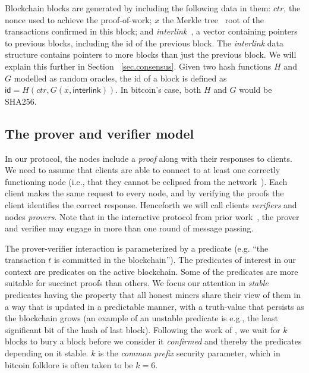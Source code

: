 Blockchain blocks are generated by including the following data in them: $ctr$,
the nonce used to achieve the proof-of-work; $x$ the Merkle tree~\cite{merkle}
root of the transactions confirmed in this block; and
\textit{interlink}~\cite{KLS}, a vector containing pointers to previous blocks,
including the id of the previous block. The \textit{interlink} data structure
contains pointers to more blocks than just the previous block. We will explain
this further in Section~ \ref{sec.consensus}. Given two hash functions $H$ and
$G$ modelled as random oracles, the id of a block is defined as $\textsf{id} =
H(ctr, G(x, \textsf{interlink}))$. In bitcoin's case, both $H$ and $G$ would be
SHA256.

\subsection{The prover and verifier model}
In our protocol, the nodes include a \emph{proof} along with their responses to
clients. We need to assume that clients are able to connect to at least one
correctly functioning node (i.e., that they cannot be eclipsed from the
network~\cite{heilman2015eclipse,hijackingbitcoin}). Each client makes the same
request to every node, and by verifying the proofs the client identifies the
correct response. Henceforth we will call clients \textit{verifiers} and nodes
\textit{provers}. Note that in the interactive protocol from prior
work~\cite{KLS},  the prover and verifier may engage in more than one round of
message passing.

The prover-verifier interaction is parameterized by a predicate (e.g. ``the
transaction $t$ is committed in the blockchain'').
%
The predicates of interest in our context are predicates on the active
blockchain. Some of the predicates are more suitable for succinct proofs than
others. We focus our attention in \textit{stable} predicates having the property
that all honest miners share their view of them in a way that is updated in a
predictable manner, with a truth-value that persists as the blockchain grows (an
example of an unstable predicate is e.g., the least significant bit of the hash
of last block). Following the work of \cite{backbone}, we wait for $k$ blocks to
bury a block before we consider it \textit{confirmed} and thereby the predicates
depending on it stable. $k$ is the \textit{common prefix} security parameter,
which in bitcoin folklore is often taken to be $k = 6$.

